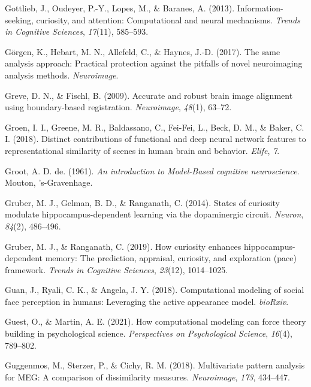 \documentclass[12pt,american,a4paper,oneside,]{memoir} %
\begin{document}
\leavevmode\hypertarget{ref-gottlieb2013information}{}%
Gottlieb, J., Oudeyer, P.-Y., Lopes, M., \& Baranes, A. (2013). Information-seeking, curiosity, and attention: Computational and neural mechanisms. \emph{Trends in Cognitive Sciences}, \emph{17}(11), 585--593.

\leavevmode\hypertarget{ref-Gorgen2017-sy}{}%
Görgen, K., Hebart, M. N., Allefeld, C., \& Haynes, J.-D. (2017). The same analysis approach: Practical protection against the pitfalls of novel neuroimaging analysis methods. \emph{Neuroimage}.

\leavevmode\hypertarget{ref-Greve2009-da}{}%
Greve, D. N., \& Fischl, B. (2009). Accurate and robust brain image alignment using boundary-based registration. \emph{Neuroimage}, \emph{48}(1), 63--72.

\leavevmode\hypertarget{ref-Groen2018-qo}{}%
Groen, I. I., Greene, M. R., Baldassano, C., Fei-Fei, L., Beck, D. M., \& Baker, C. I. (2018). Distinct contributions of functional and deep neural network features to representational similarity of scenes in human brain and behavior. \emph{Elife}, \emph{7}.

\leavevmode\hypertarget{ref-degroot}{}%
Groot, A. D. de. (1961). \emph{An introduction to Model-Based cognitive neuroscience}. Mouton, 's-Gravenhage.

\leavevmode\hypertarget{ref-gruber2014states}{}%
Gruber, M. J., Gelman, B. D., \& Ranganath, C. (2014). States of curiosity modulate hippocampus-dependent learning via the dopaminergic circuit. \emph{Neuron}, \emph{84}(2), 486--496.

\leavevmode\hypertarget{ref-gruber2019curiosity}{}%
Gruber, M. J., \& Ranganath, C. (2019). How curiosity enhances hippocampus-dependent memory: The prediction, appraisal, curiosity, and exploration (pace) framework. \emph{Trends in Cognitive Sciences}, \emph{23}(12), 1014--1025.

\leavevmode\hypertarget{ref-Guan2018-hq}{}%
Guan, J., Ryali, C. K., \& Angela, J. Y. (2018). Computational modeling of social face perception in humans: Leveraging the active appearance model. \emph{bioRxiv}.

\leavevmode\hypertarget{ref-Guest2020-ef}{}%
Guest, O., \& Martin, A. E. (2021). How computational modeling can force theory building in psychological science. \emph{Perspectives on Psychological Science}, \emph{16}(4), 789--802.

\leavevmode\hypertarget{ref-Guggenmos2018-rr}{}%
Guggenmos, M., Sterzer, P., \& Cichy, R. M. (2018). Multivariate pattern analysis for MEG: A comparison of dissimilarity measures. \emph{Neuroimage}, \emph{173}, 434--447.
\end{document}

